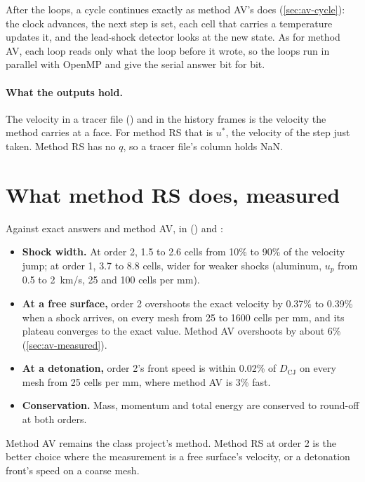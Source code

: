 After the loops, a cycle continues exactly as method AV's does
(\cref{sec:av-cycle}): the clock advances, the next step is set, each cell
that carries a temperature updates it, and the lead-shock detector looks at
the new state. As for method AV, each loop reads only what the loop before
it wrote, so the loops run in parallel with OpenMP and give the serial
answer bit for bit.

\paragraph{What the outputs hold.} The velocity in a tracer file
() and in the history frames is the velocity the method carries
at a face. For method RS that is $u^*$, the velocity of the step just
taken. Method RS has no $q$, so a tracer file's  column holds NaN.

\section{What method RS does, measured}
\label{sec:rs-measured}

Against exact answers and method AV, in 
() and :

\begin{itemize}
\item \textbf{Shock width.} At order 2, 1.5 to 2.6 cells from 10\% to 90\%
  of the velocity jump; at order 1, 3.7 to 8.8 cells, wider for weaker
  shocks (aluminum, $u_p$ from 0.5 to 2~km/s, 25 and 100 cells per mm).
\item \textbf{At a free surface,} order 2 overshoots the exact velocity by
  0.37\% to 0.39\% when a shock arrives, on every mesh from 25 to 1600 cells
  per mm, and its plateau converges to the exact value. Method AV
  overshoots by about 6\% (\cref{sec:av-measured}).
\item \textbf{At a detonation,} order 2's front speed is within 0.02\% of
  $D_{\mathrm{CJ}}$ on every mesh from 25 cells per mm, where method AV is
  3\% fast.
\item \textbf{Conservation.} Mass, momentum and total energy are conserved
  to round-off at both orders.
\end{itemize}

Method AV remains the class project's method. Method RS at order 2 is the
better choice where the measurement is a free surface's velocity, or a
detonation front's speed on a coarse mesh.
